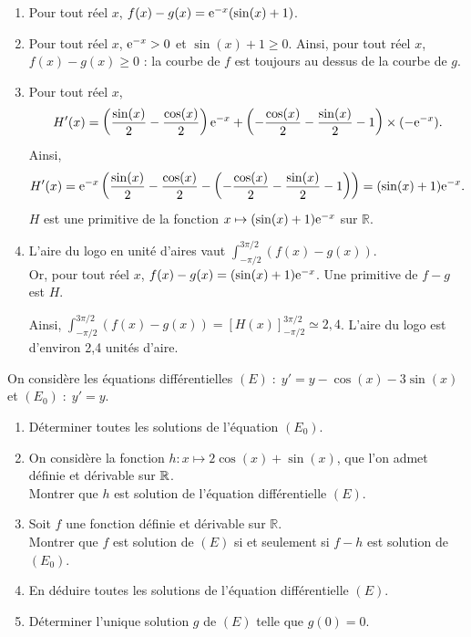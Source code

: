 \documentclass[11pt,fleqn, openany]{book} %
\begin{document}
\begin{solution}
\begin{enumerate}
\item Pour tout réel $x$, $f(x)-g(x)=\mathrm{e}^{-x}(\sin(x)+1)$.
\item Pour tout réel $x$, $\mathrm{e}^{-x}>0$ et $\sin(x)+1 \geqslant 0$. Ainsi, pour tout réel $x$, $f(x)-g(x)\geqslant 0$ : la courbe de $f$ est toujours au dessus de la courbe de $g$.
\item Pour tout réel $x$,
\[H'(x)=\left(\dfrac{\sin(x)}{2}-\dfrac{\cos(x)}{2}\right)\mathrm{e}^{-x}+\left(-\dfrac{\cos(x)}{2}-\dfrac{ \sin(x)}{2}-1\right) \times(-\mathrm{e}^{-x}).\]
Ainsi,
\[H'(x)=\mathrm{e}^{-x}\left(\dfrac{\sin(x)}{2}-\dfrac{\cos(x)}{2}-\left(-\dfrac{\cos(x)}{2}-\dfrac{ \sin(x)}{2}-1\right) \right)=(\sin(x)+1)\mathrm{e}^{-x}.\]
 $H$ est une primitive de la fonction  $x\mapsto (\sin(x)+1)\mathrm{e}^{-x}$ sur $\mathbb{R}$.
\item L'aire du logo en unité d'aires vaut $\displaystyle\int_{-\pi/2}^{3\pi/2}(f(x)-g(x))$. \\ Or, pour tout réel $x$, $f(x)-g(x)=(\sin(x)+1)\mathrm{e}^{-x}$. Une primitive de $f-g$ est $H$. 

Ainsi, $\displaystyle\int_{-\pi/2}^{3\pi/2}(f(x)-g(x)) = \left[H(x)\right]_{-\pi/2}^{3\pi/2} \simeq 2,4$. L'aire du logo est d'environ 2,4 unités d'aire.
\end{enumerate}
\newpage
\end{solution}

\begin{exercise}[topic=trig02, subtitle={(Centres étrangers 2024)}]

On considère les équations différentielles $(E)\; : \; y'=y-\cos(x)-3\sin(x)$ et $(E_0)\; : \; y'=y$.

\begin{enumerate}
\item Déterminer toutes les solutions de l'équation $(E_0)$.
\item On considère la fonction $h:x\mapsto 2\cos(x)+\sin(x)$, que l'on admet définie et dérivable sur $\mathbb{R}$. \\Montrer que $h$ est solution de l'équation différentielle $(E)$.
\item Soit $f$ une fonction définie et dérivable sur $\mathbb{R}$. \\Montrer que $f$ est solution de $(E)$ si et seulement si $f-h$ est solution de $(E_0)$.
\item En déduire toutes les solutions de l'équation différentielle $(E)$.
\item Déterminer l'unique solution $g$ de $(E)$ telle que $g(0)=0$.
\end{enumerate}

\end{exercise}
\end{document}
